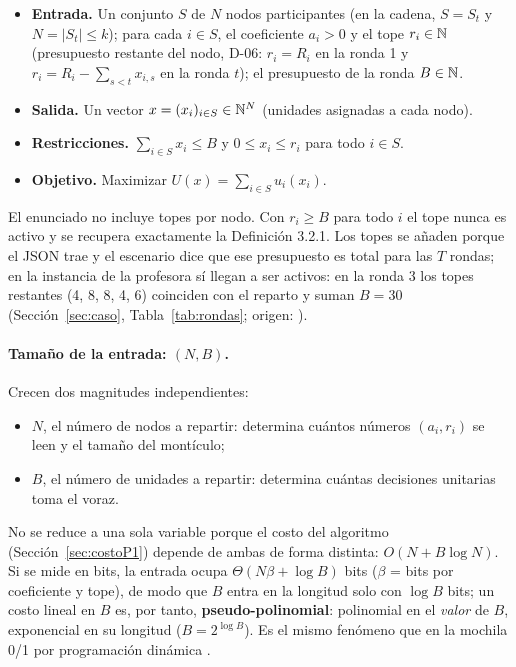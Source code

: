 \begin{definicion}\label{def:reparto}
\leavevmode
\begin{itemize}[leftmargin=*]
\item \textbf{Entrada.} Un conjunto $S$ de $N$ nodos participantes (en la cadena, $S=S_t$ y $N=|S_t|\le k$); para cada $i\in S$, el coeficiente $a_i>0$ y el tope $r_i\in\mathbb{N}$ (presupuesto restante del nodo, D-06: $r_i=R_i$ en la ronda 1 y $r_i=R_i-\sum_{s<t}x_{i,s}$ en la ronda $t$); el presupuesto de la ronda $B\in\mathbb{N}$.
\item \textbf{Salida.} Un vector $x=(x_i)_{i\in S}\in\mathbb{N}^{N}$ (unidades asignadas a cada nodo).
\item \textbf{Restricciones.} $\sum_{i\in S}x_i\le B$ y $0\le x_i\le r_i$ para todo $i\in S$.
\item \textbf{Objetivo.} Maximizar $U(x)=\sum_{i\in S}u_i(x_i)$.
\end{itemize}
\end{definicion}

\begin{observacion}
El enunciado no incluye topes por nodo. Con $r_i\ge B$ para todo $i$ el tope nunca es activo y se recupera exactamente la Definición 3.2.1. Los topes se añaden porque el JSON trae  y el escenario dice que ese presupuesto es total para las $T$ rondas; en la instancia de la profesora sí llegan a ser activos: en la ronda 3 los topes restantes (4, 8, 8, 4, 6) coinciden con el reparto y suman $B=30$ (Sección~\ref{sec:caso}, Tabla~\ref{tab:rondas}; origen: ).
\end{observacion}

\paragraph{Tamaño de la entrada: $(N,B)$.} Crecen dos magnitudes independientes:
\begin{itemize}[leftmargin=*]
\item $N$, el número de nodos a repartir: determina cuántos números $(a_i,r_i)$ se leen y el tamaño del montículo;
\item $B$, el número de unidades a repartir: determina cuántas decisiones unitarias toma el voraz.
\end{itemize}
No se reduce a una sola variable porque el costo del algoritmo (Sección~\ref{sec:costoP1}) depende de ambas de forma distinta: $O(N+B\log N)$. Si se mide en bits, la entrada ocupa $\Theta(N\beta+\log B)$ bits ($\beta$ = bits por coeficiente y tope), de modo que $B$ entra en la longitud solo con $\log B$ bits; un costo lineal en $B$ es, por tanto, \textbf{pseudo-polinomial}: polinomial en el \emph{valor} de $B$, exponencial en su longitud ($B=2^{\log B}$). Es el mismo fenómeno que en la mochila 0/1 por programación dinámica \cite{enunciado}.

